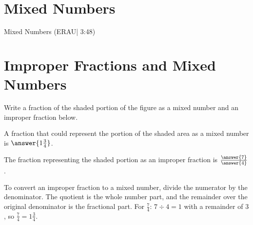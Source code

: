 \documentclass{ximera}
\begin{document}

\section*{Mixed Numbers}

Mixed Numbers (ERAU| 3:48)



\section*{Improper Fractions and Mixed Numbers}

\begin{problem}
 
Write a fraction of the shaded portion of the figure as a mixed number and an improper fraction below.
 
\begin{center}
\end{center}
 
A fraction that could represent the portion of the shaded area as a mixed number is $\answer{1\frac{3}{4}}$.

The fraction representing the shaded portion as an improper fraction is $\frac{\answer{7}}{\answer{4}}$.

\begin{feedback}
To convert an improper fraction to a mixed number, divide the numerator by the denominator. The quotient is the whole number part, and the remainder over the original denominator is the fractional part. For $\frac{7}{4}$: $7 \div 4 = 1$ with a remainder of $3$, so $\frac{7}{4} = 1\frac{3}{4}$.
\end{feedback}

\end{problem}
 
\end{document}
